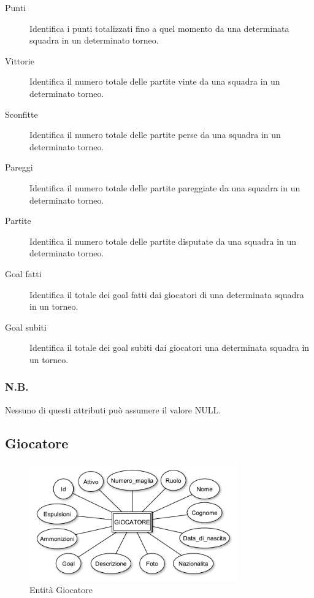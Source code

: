 		\begin{description}
			
			\item[Punti]
			Identifica i punti totalizzati fino a quel momento da una determinata squadra in un determinato torneo.
			
			\item[Vittorie]
			Identifica il numero totale delle partite vinte da una squadra in un determinato torneo.
			
			\item[Sconfitte]
			Identifica il numero totale delle partite perse da una squadra in un determinato torneo.
			
			\item[Pareggi]
			Identifica il numero totale delle partite pareggiate da una squadra in un determinato torneo.
			
			\item[Partite]
			Identifica il numero totale delle partite disputate da una squadra in un determinato torneo.
			
			\item[Goal fatti]
			Identifica il totale dei goal fatti dai giocatori di una determinata squadra in un torneo.
			
			\item[Goal subiti]
			Identifica il totale dei goal subiti dai giocatori una determinata squadra in un torneo.
			
		\end{description}
		
		\subsubsection*{N.B.}
		Nessuno di questi attributi può assumere il valore NULL.
		
	\subsection{Giocatore}
	
		\begin{figure}[h]
			\centering
			\includegraphics[width=0.8\textwidth]
			{immagini/11-giocatore}
			
			\caption{Entità Giocatore}
		\end{figure}
		

